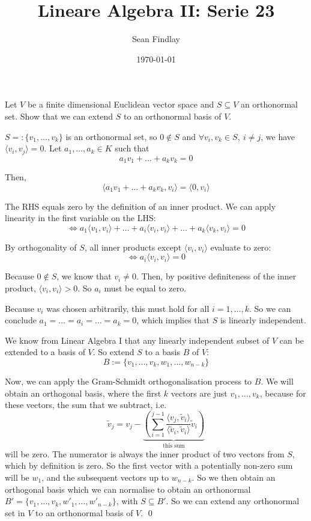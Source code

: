 \documentclass[12pt]{article}
\title{Lineare Algebra II: Serie 23}
\author{Sean Findlay}
\date{\today}
\begin{document}
\maketitle

\begin{problem}{}{}
    Let $V$ be a finite dimensional Euclidean vector space and $S \subseteq V$ an orthonormal set. Show that we can extend $S$ to an orthonormal basis of $V$.
\end{problem}

$S =: \{v_1,\dots,v_k\}$ is an orthonormal set, so $0 \notin S$ and $\forall v_i, v_k \in S,\ i \neq j$, we have $\langle v_i, v_j \rangle = 0$. Let $a_1,\dots,a_k \in K$ such that
$$
    a_1v_1 + \dots + a_kv_k = 0
$$

Then,
$$
    \langle a_1v_1 + \dots + a_kv_k, v_i \rangle = \langle 0, v_i \rangle
$$

The RHS equals zero by the definition of an inner product. We can apply linearity in the first variable on the LHS:
$$
    \iff a_1 \langle v_1, v_i \rangle + \dots + a_i \langle v_i, v_i \rangle + \dots + a_k \langle v_k, v_i \rangle = 0
$$

By orthogonality of $S$, all inner products except $\langle v_i, v_i \rangle$ evaluate to zero:
$$
    \iff a_i \langle v_i, v_i \rangle = 0
$$

Because $0 \notin S$, we know that $v_i \neq 0$. Then, by positive definiteness of the inner product, $\langle v_i, v_i \rangle > 0$. So $a_i$ must be equal to zero.

Because $v_i$ was chosen arbitrarily, this must hold for all $i = 1,\dots,k$. So we can conclude $a_1 = \dots = a_i = \dots = a_k = 0$, which implies that $S$ is linearly independent.

We know from Linear Algebra I that any linearly independent subset of $V$ can be extended to a basis of $V$. So extend $S$ to a basis $B$ of $V$:
$$
    B := \{v_1,\dots,v_k,w_1,\dots,w_{n-k}\}
$$

Now, we can apply the Gram-Schmidt orthogonalisation process to $B$. We will obtain an orthogonal basis, where the first $k$ vectors are just $v_1,\dots,v_k$, because for these vectors, the sum that we subtract, i.e.
$$
    \tilde v_j = v_j - \underbrace{\left( \sum_{i = 1}^{j -1} \frac{\langle v_j, \tilde v_i \rangle}{\langle \tilde v_i, \tilde v_i \rangle} \tilde v_i  \right)}_{\text{this sum}}
$$
will be zero. The numerator is always the inner product of two vectors from $S$, which by definition is zero. So the first vector with a potentially non-zero sum will be $w_1$, and the subsequent vectors up to $w_{n-k}$. So we then obtain an orthogonal basis which we can normalise to obtain an orthonormal $B' = \{v_1,\dots,v_k,w'_1,\dots,w'_{n-k}\}$, with $S \subseteq B'$. So we can extend any orthonormal set in $V$ to an orthonormal basis of $V$. \qed
\end{document}
